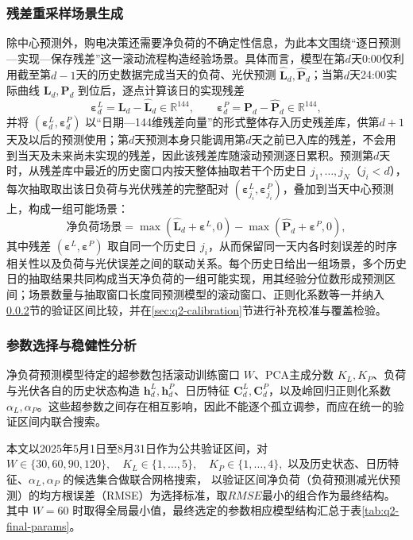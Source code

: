 \subsubsection{残差重采样场景生成}
\label{sec:q2-scenario}
除中心预测外，购电决策还需要净负荷的不确定性信息，为此本文围绕``逐日预测—实现—保存残差''这一滚动流程构造经验场景。具体而言，模型在第$d$天0:00仅利用截至第$d-1$天的历史数据完成当天的负荷、光伏预测 $\widehat{\bm L}_d,\widehat{\bm P}_d$；当第$d$天24:00实际曲线 $\bm L_d,\bm P_d$ 到位后，逐点计算该日的实现残差
\begin{equation}
\bm\varepsilon_d^L=\bm L_d-\widehat{\bm L}_d\in\mathbb{R}^{144},\qquad
\bm\varepsilon_d^P=\bm P_d-\widehat{\bm P}_d\in\mathbb{R}^{144},
\end{equation}
并将 $(\bm\varepsilon_d^L,\bm\varepsilon_d^P)$ 以``日期—144维残差向量''的形式整体存入历史残差库，供第$d+1$天及以后的预测使用；第$d$天预测本身只能调用第$d$天之前已入库的残差，不会用到当天及未来尚未实现的残差，因此该残差库随滚动预测逐日累积。预测第$d$天时，从残差库中最近的历史窗口内按天整体抽取若干个历史日 $j_1,\ldots,j_N$（$j_i<d$），每次抽取取出该日负荷与光伏残差的完整配对 $(\bm\varepsilon_{j_i}^L,\bm\varepsilon_{j_i}^P)$，叠加到当天中心预测上，构成一组可能场景：
\begin{equation}
\text{净负荷场景}=\max(\widehat{\bm L}_d+\bm\varepsilon^L,0)-\max(\widehat{\bm P}_d+\bm\varepsilon^P,0),
\end{equation}
其中残差 $(\bm\varepsilon^L,\bm\varepsilon^P)$ 取自同一个历史日 $j_i$，从而保留同一天内各时刻误差的时序相关性以及负荷与光伏误差之间的联动关系。每个历史日给出一组场景，多个历史日的抽取结果共同构成当天净负荷的一组可能实现，用其经验分位数形成预测区间；场景数量与抽取窗口长度同预测模型的滚动窗口、正则化系数等一并纳入\ref{sec:q2-tuning}节的验证区间比较，并在\ref{sec:q2-calibration}节进行补充校准与覆盖检验。

\subsubsection{参数选择与稳健性分析}
\label{sec:q2-tuning}
净负荷预测模型待定的超参数包括滚动训练窗口 $W$、PCA主成分数 $K_L,K_P$、负荷与光伏各自的历史状态构造 $\bm h_d^L,\bm h_d^P$、日历特征 $\bm C_d^L,\bm C_d^P$，以及岭回归正则化系数 $\alpha_L,\alpha_P$。这些超参数之间存在相互影响，因此不能逐个孤立调参，而应在统一的验证区间内联合搜索。

本文以2025年5月1日至8月31日作为公共验证区间，对$W\in\{30,60,90,120\},\quad K_L\in\{1,\ldots,5\},\quad K_P\in\{1,\ldots,4\},$
以及历史状态、日历特征、$\alpha_L,\alpha_P$ 的候选集合做联合网格搜索，
以验证区间净负荷（负荷预测减光伏预测）的均方根误差（RMSE）为选择标准，取$RMSE$最小的组合作为最终结构。
其中 $W=60$ 时取得全局最小值，最终选定的参数相应模型结构汇总于表\ref{tab:q2-final-params}。

